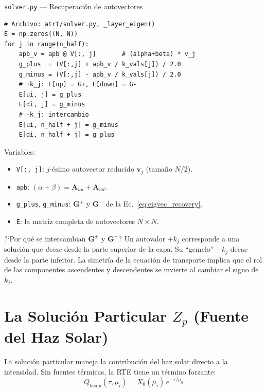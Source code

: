 \documentclass[a4paper,11pt]{article}
\begin{document}
\begin{implementation}{\texttt{solver.py} --- Recuperaci\'on de autovectores}
\begin{lstlisting}
# Archivo: atrt/solver.py, _layer_eigen()
E = np.zeros((N, N))
for j in range(n_half):
    apb_v = apb @ V[:, j]       # (alpha+beta) * v_j
    g_plus  = (V[:,j] + apb_v / k_vals[j]) / 2.0
    g_minus = (V[:,j] - apb_v / k_vals[j]) / 2.0
    # +k_j: E[up] = G+, E[down] = G-
    E[ui, j] = g_plus
    E[di, j] = g_minus
    # -k_j: intercambio
    E[ui, n_half + j] = g_minus
    E[di, n_half + j] = g_plus
\end{lstlisting}
Variables:
\begin{itemize}
\item \texttt{V[:, j]}: $j$-\'esimo autovector reducido $\mathbf{v}_j$ (tama\~no $N/2$).
\item \texttt{apb}: $(\alpha + \beta) = \mathbf{A}_{uu} + \mathbf{A}_{ud}$.
\item \texttt{g\_plus}, \texttt{g\_minus}: $\mathbf{G}^+$ y $\mathbf{G}^-$ de la Ec.~\eqref{eq:eigvec_recovery}.
\item \texttt{E}: la matriz completa de autovectores $N \times N$.
\end{itemize}
\end{implementation}

\begin{physics}{?`Por qu\'e se intercambian $\mathbf{G}^+$ y $\mathbf{G}^-$?}
Un autovalor $+k_j$ corresponde a una soluci\'on que \textit{decae} desde la parte superior de la capa. Su ``gemelo'' $-k_j$ decae desde la parte inferior. La simetr\'ia de la ecuaci\'on de transporte implica que el rol de las componentes ascendentes y descendentes se invierte al cambiar el signo de $k_j$.
\end{physics}

\section{La Soluci\'on Particular $Z_p$ (Fuente del Haz Solar)}
\label{sec:particular}

La soluci\'on particular maneja la contribuci\'on del haz solar directo a la intensidad. Sin fuentes t\'ermicas, la RTE tiene un t\'ermino forzante:
\begin{equation}
Q_{\text{beam}}(\tau, \mu_i) = X_0(\mu_i) \, e^{-\tau/\mu_0}
\end{equation}
\end{document}
